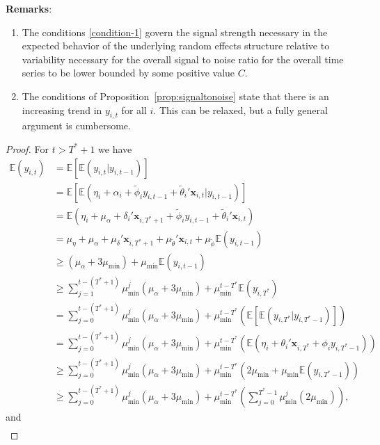 \documentclass[11pt]{article}
\newcommand{\x}{\textbf{x}}
\def\E{\mathbb{E}} %
\theoremstyle{definition}
\begin{document}
\textbf{Remarks}:
\begin{enumerate}
  \item The conditions \eqref{condition-1} govern the signal strength necessary in the expected behavior of the underlying random effects structure relative to variability necessary for the overall signal to noise ratio for the overall time series to be lower bounded by some positive value $C$.
  \item The conditions of Proposition~\ref{prop:signaltonoise} state that there is an increasing trend in $y_{i,t}$ for all $i$. This can be relaxed, but a fully general argument is cumbersome.
\end{enumerate}



\begin{proof}
For $t > T^* + 1$ we have 
\begin{align*}
  \E(y_{i,t}) &= \E\left[\E(y_{i,t}|y_{i,t-1})\right] \\ 
    &= \E\left[\E(\eta_i + \alpha_i + \tilde\phi_i y_{i,t-1} 
      + \tilde\theta_i'\x_{i,t}|y_{i,t-1})\right] \\
    &= \E(\eta_i + \mu_\alpha + \delta_i'\x_{i,T^*+1} + \tilde\phi_i y_{i,t-1} + \tilde\theta_i'\x_{i,t}) \\
    &= \mu_\eta + \mu_\alpha + \mu_\delta'\x_{i,T^*+1} + \mu_{\tilde\theta}'\x_{i,t} + \mu_{\tilde\phi}\E(y_{i,t-1}) \\
    &\geq (\mu_\alpha + 3\mu_{\min}) + \mu_{\min}\E(y_{i,t-1}) \\
    &\geq \sum_{j=1}^{t - (T^* + 1)} \mu_{\min}^j(\mu_{\alpha} + 3\mu_{\min}) + \mu_{\min}^{t-T^*}\E(y_{i,T^*}) \\
    &= \sum_{j=0}^{t - (T^* + 1)} \mu_{\min}^j(\mu_{\alpha} + 3\mu_{\min}) + \mu_{\min}^{t-T^*}\left(\E\left[\E(y_{i,T^*}|y_{i,T^*-1})\right]\right) \\   
    &= \sum_{j=0}^{t - (T^* + 1)} \mu_{\min}^j(\mu_{\alpha} + 3\mu_{\min}) + \mu_{\min}^{t-T^*}\left(\E(\eta_i + \theta_i'\x_{i,T^*} + \phi_i y_{i,T^*-1}) \right) \\
    &\geq \sum_{j=0}^{t - (T^* + 1)} \mu_{\min}^j(\mu_{\alpha} + 3\mu_{\min}) + \mu_{\min}^{t-T^*}\left(2\mu_{\min} + \mu_{\min} \E(y_{i,T^*-1}) \right) \\
    &\geq \sum_{j=0}^{t - (T^* + 1)} \mu_{\min}^j(\mu_{\alpha} + 3\mu_{\min}) + \mu_{\min}^{t-T^*}\left(\sum_{j=0}^{T^*-1}\mu_{\min}^j(2\mu_{\min}) \right), 
\end{align*}
and 
\begin{align*}

\end{align*}
\end{proof}
\end{document}
